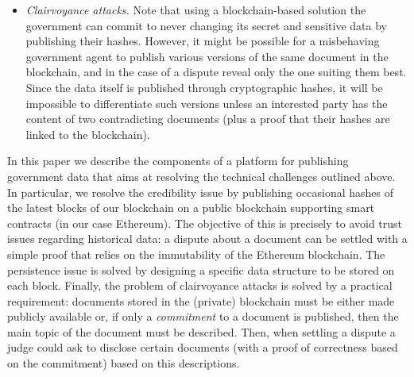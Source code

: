 \begin{itemize}
\item {\it Clairvoyance attacks.} Note that using a blockchain-based solution the government can commit to never changing its secret and sensitive data by publishing their hashes. However, it might be possible for a misbehaving government agent to publish various versions of the same document in the blockchain, and in the case of a dispute reveal only the one suiting them best. Since the data itself is published through cryptographic hashes, it will be impossible to differentiate such versions unless an interested party has the content of two contradicting documents (plus a proof that their hashes are linked to the blockchain).
\end{itemize}

In this paper we describe the components of a platform for publishing government data that aims at resolving the technical challenges outlined above. In particular, we resolve the credibility issue by publishing occasional hashes of the latest blocks of our blockchain on a public blockchain supporting smart contracts (in our case Ethereum). The objective of this is precisely to avoid trust issues regarding historical data: a dispute about a document can be settled with a simple proof that relies on the immutability of the Ethereum blockchain. The persistence issue is solved by designing a specific data structure to be stored on each block. Finally, the problem of clairvoyance attacks is solved by a practical requirement: documents stored in the (private) blockchain must be either made publicly available or, if only a \emph{commitment} to a document is published, then the main topic of the document must be described. Then, when settling a dispute a judge could ask to disclose certain documents (with a proof of correctness based on the commitment) based on this descriptions.


